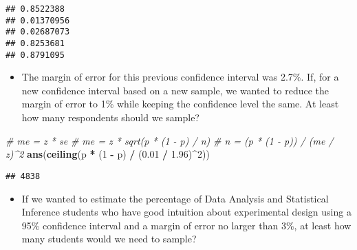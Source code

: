 \documentclass[]{book}
\newenvironment{Shaded}{\begin{snugshade}}{\end{snugshade}}
\newcommand{\CommentTok}[1]{\textcolor[rgb]{0.56,0.35,0.01}{\textit{#1}}}
\newcommand{\DecValTok}[1]{\textcolor[rgb]{0.00,0.00,0.81}{#1}}
\newcommand{\FloatTok}[1]{\textcolor[rgb]{0.00,0.00,0.81}{#1}}
\newcommand{\KeywordTok}[1]{\textcolor[rgb]{0.13,0.29,0.53}{\textbf{#1}}}
\newcommand{\NormalTok}[1]{#1}
\newcommand{\OperatorTok}[1]{\textcolor[rgb]{0.81,0.36,0.00}{\textbf{#1}}}
\newcommand{\StringTok}[1]{\textcolor[rgb]{0.31,0.60,0.02}{#1}}
\providecommand{\tightlist}{%
  \setlength{\itemsep}{0pt}\setlength{\parskip}{0pt}}
\begin{document}
\begin{Shaded}
\end{Shaded}

\begin{verbatim}
## 0.8522388
## 0.01370956
## 0.02687073
## 0.8253681
## 0.8791095
\end{verbatim}

\begin{itemize}
\tightlist
\item
  The margin of error for this previous confidence interval was 2.7\%. If, for a new confidence interval based on a new sample, we wanted to reduce the margin of error to 1\% while keeping the confidence level the same. At least how many respondents should we sample?
\end{itemize}

\begin{Shaded}
\begin{Highlighting}[]
\CommentTok{# me = z * se}
\CommentTok{# me = z * sqrt(p * (1 - p) / n)}
\CommentTok{# n = (p * (1 - p)) / (me / z)^2}
\KeywordTok{ans}\NormalTok{(}\KeywordTok{ceiling}\NormalTok{(p }\OperatorTok{*}\StringTok{ }\NormalTok{(}\DecValTok{1} \OperatorTok{-}\StringTok{ }\NormalTok{p) }\OperatorTok{/}\StringTok{ }\NormalTok{(}\FloatTok{0.01} \OperatorTok{/}\StringTok{ }\FloatTok{1.96}\NormalTok{)}\OperatorTok{^}\DecValTok{2}\NormalTok{))}
\end{Highlighting}
\end{Shaded}

\begin{verbatim}
## 4838
\end{verbatim}

\begin{itemize}
\tightlist
\item
  If we wanted to estimate the percentage of Data Analysis and Statistical Inference students who have good intuition about experimental design using a 95\% confidence interval and a margin of error no larger than 3\%, at least how many students would we need to sample?
\end{itemize}
\end{document}
